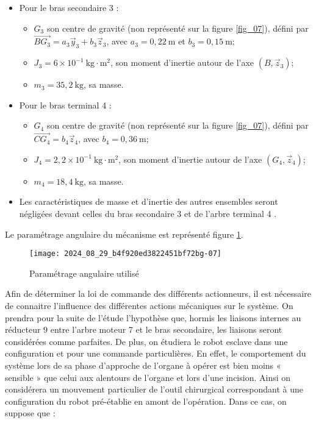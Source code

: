 \begin{itemize}
  \item Pour le bras secondaire 3 :
\begin{itemize}
  \item $G_{3}$ son centre de gravité (non représenté sur la figure \ref{fig_07}), défini par $\overrightarrow{B G_{3}}=a_{3} \vec{y}_{3}+b_{3} \vec{z}_{3}$, avec $a_{3}=0,22 \mathrm{~m}$ et $b_{3}=0,15 \mathrm{~m}$;
  \item $J_{3}=6 \times 10^{-1} \mathrm{~kg} \cdot \mathrm{m}^{2}$, son moment d'inertie autour de l'axe $\left(B, \vec{z}_{3}\right)$;
  \item $m_{3}=35,2 \mathrm{~kg}$, sa masse.
  \end{itemize}
  \item Pour le bras terminal 4 :
  \begin{itemize}
  \item $G_{4}$ son centre de gravité (non représenté sur la figure \ref{fig_07}), défini par $\overrightarrow{C G_{4}}=b_{4} \vec{z}_{4}$, avec $b_{4}=0,36 \mathrm{~m}$;
  \item $J_{4}=2,2 \times 10^{-1} \mathrm{~kg} \cdot \mathrm{m}^{2}$, son moment d'inertie autour de l'axe $\left(G_{4}, \vec{z}_{4}\right)$;
  \item $m_{4}=18,4 \mathrm{~kg}$, sa masse.
  \end{itemize}
  
  \item Les caractéristiques de masse et d'inertie des autres ensembles seront négligées devant celles du bras secondaire 3 et de l'arbre terminal 4 .\\
  \end{itemize}
Le paramétrage angulaire du mécanisme est représenté figure \ref{fig_08}.


\begin{figure}[!h]
\centering
\texttt{[image: 2024\_08\_29\_b4f920ed3822451bf72bg-07]}
\caption{\label{fig_08} Paramétrage angulaire utilisé}
\end{figure}

Afin de déterminer la loi de commande des différents actionneurs, il est nécessaire de connaitre l'influence des différentes actions mécaniques sur le système. On prendra pour la suite de l'étude l'hypothèse que, hormis les liaisons internes au réducteur 9 entre l'arbre moteur 7 et le bras secondaire, les liaisons seront considérées comme parfaites. De plus, on étudiera le robot esclave dans une configuration et pour une commande particulières. En effet, le comportement du système lors de sa phase d'approche de l'organe à opérer est bien moins « sensible » que celui aux alentours de l'organe et lors d'une incision. Ainsi on considérera un mouvement particulier de l'outil chirurgical correspondant à une configuration du robot pré-établie en amont de l'opération. Dans ce cas, on suppose que :

